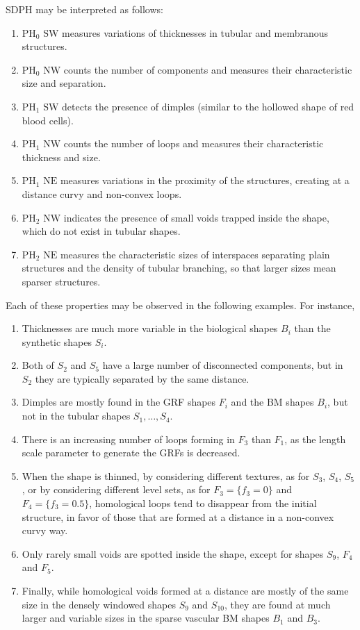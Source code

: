 \documentclass[11pt]{article}
\newcommand{\PH}{\mathrm{PH}}
\newcommand{\SW}{\mathrm{SW}}
\newcommand{\NW}{\mathrm{NW}}
\newcommand{\NE}{\mathrm{NE}}
\theoremstyle{plain}
\theoremstyle{definition}
\theoremstyle{remark}
\begin{document}
SDPH may be interpreted as follows:
\begin{enumerate}
\item $\PH_0$ $\SW$ measures variations of thicknesses in tubular and membranous structures.
\item $\PH_0$ $\NW$ counts the number of components and measures their characteristic size and separation. 
\item $\PH_1$ $\SW$ detects the presence of dimples (similar to the hollowed shape of red blood cells). 
\item $\PH_1$ $\NW$ counts the number of loops and measures their characteristic thickness and size. 
\item $\PH_1$ $\NE$ measures variations in the proximity of the structures, creating at a distance curvy and non-convex loops. 
\item $\PH_2$ $\NW$ indicates the presence of small voids trapped inside the shape, which do not exist in tubular shapes. 
\item $\PH_2$ $\NE$ measures the characteristic sizes of interspaces separating plain structures and the density of tubular branching, so that larger sizes mean sparser structures. 
\end{enumerate}

Each of these properties may be observed in the following examples. For instance, 
\begin{enumerate}
\item Thicknesses are much more variable in the biological shapes $B_i$ than the synthetic shapes $S_i$. 
\item Both of $S_2$ and $S_5$ have a large number of disconnected components, but in $S_2$ they are typically separated by the same distance. 
\item Dimples are mostly found in the GRF shapes $F_i$ and the BM shapes $B_i$, but not in the tubular shapes $S_1, \ldots, S_4$.
\item There is an increasing number of loops forming in $F_3$ than $F_1$, as the length scale parameter to generate the GRFs is decreased.
\item When the shape is thinned, by considering different textures, as for $S_3$, $S_4$, $S_5$, or by considering different level sets, as for $F_3 = \{f_3 = 0\}$ and $F_4 = \{f_3 = 0.5\}$, homological loops tend to disappear from the initial structure, in favor of those that are formed at a distance in a non-convex curvy way.
\item Only rarely small voids are spotted inside the shape, except for shapes $S_9$, $F_4$ and $F_5$. 
\item Finally, while homological voids formed at a distance are mostly of the same size in the densely windowed shapes $S_9$ and $S_{10}$, they are found at much larger and variable sizes in the sparse vascular BM shapes $B_1$ and $B_3$.
\end{enumerate}
\end{document}
